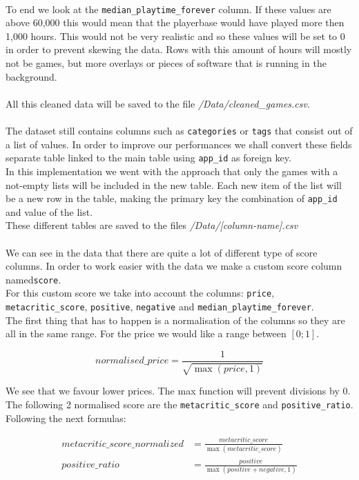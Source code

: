\documentclass{article}
\begin{document}
	\\
	To end we look at the \texttt{median\_playtime\_forever} column. If these values are above 60,000 this would mean that the playerbase would have played more then 1,000 hours. This would not be very realistic and so these values will be set to 0 in order to prevent skewing the data. Rows with this amount of hours will mostly not be games, but more overlays or pieces of software that is running in the background.\\
	\\
	All this cleaned data will be saved to the file \textit{/Data/cleaned\_games.csv}.\\
	\\
	The dataset still contains columns such as \texttt{categories} or \texttt{tags} that consist out of a list of values. In order to improve our performances we shall convert these fields separate table linked to the main table using \texttt{app\_id} as foreign key.\\
	In this implementation we went with the approach that only the games with a not-empty lists will be included in the new table. Each new item of the list will be a new row in the table, making the primary key the combination of \texttt{app\_id} and value of the list.\\
	These different tables are saved to the files \textit{/Data/[column-name].csv}\\
	\\
	We can see in the data that there are quite a lot of different type of score columns. In order to work easier with the data we make a custom score column named\texttt{score}.\\
	For this custom score we take into account the columns: \texttt{price}, \texttt{metacritic\_score}, \texttt{positive}, \texttt{negative} and \texttt{median\_playtime\_forever}.\\
	The first thing that has to happen is a normalisation of the columns so they are all in the same range. For the price we would like a range between $\left[0;1\right]$.
	
	$$normalised\_price = \frac{1}{\sqrt{\max{\left(price, 1\right)}}}$$
	
	We see that we favour lower prices. The max function will prevent divisions by 0.\\
	The following 2 normalised score are the \texttt{metacritic\_score} and \texttt{positive\_ratio}. Following the next formulas:
	
	\begin{align}
		metacritic\_score\_normalized &= \frac{metacritic\_score}{\max{\left(metacritic\_score\right)}} \\
		positive\_ratio &= \frac{positive}{\max{\left(positive + negative, 1\right)}}
	\end{align}
	
\end{document}
